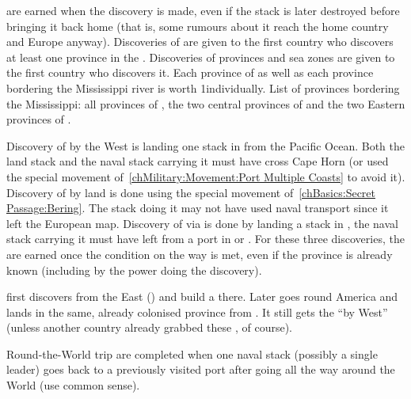 \aparag[Discoveries] \VPs are earned when the discovery is made, even if the
stack is later destroyed before bringing it back home (that is, some rumours
about it reach the home country and Europe anyway).
\bparag Discoveries \VPs of \Areas are given to the first country who
discovers at least one province in the \Area.
\bparag Discoveries \VPs of provinces and sea zones are given to the first
country who discovers it. Each province of \granderegionAmazonia as well as
each province bordering the Mississippi river is worth 1\VP individually.
\bparag List of provinces bordering the Mississippi: all provinces of
\granderegionMississippi, the two central provinces of \granderegionIllinois
and the two Eastern provinces of \granderegionKansas.

\bparag Discovery of \granderegionPanama by the West is landing one stack in
\granderegionPanama from the Pacific Ocean. Both the land stack and the naval
stack carrying it must have cross Cape Horn (or used the special movement
of~\ref{chMilitary:Movement:Port Multiple Coasts} to avoid it).
\bparag Discovery of \granderegionKamchatka by land is done using the special
movement of~\ref{chBasics:Secret Passage:Bering}. The stack doing it may not
have used naval transport since it left the European map.
\bparag Discovery of \granderegionAlaska via \continentAsia is done by landing
a stack in \granderegionAlaska, the naval stack carrying it must have left
from a port in \continentAsia or \continentSiberia.
\bparag For these three discoveries, the \VPs are earned once the condition on
the way is met, even if the province is already known (including by the power
doing the discovery). 

\begin{exemple}
  \HIS first discovers \granderegionPanama from the East
  (\seazoneMexique) and build a \COL there. Later \HIS goes round
  America and lands in the same, already colonised province from
  \seazonePanama. It still gets the ``\granderegionPanama by West'' \VPs
  (unless another country already grabbed these \VPs, of course).
\end{exemple}


\aparag[Circumnavigation] Round-the-World trip are completed when one naval
stack (possibly a single leader) goes back to a previously visited port after
going all the way around the World (use common sense).


